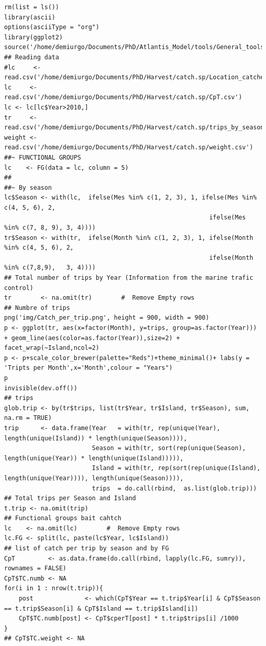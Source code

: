 \documentclass[11pt]{article}
\begin{document}
\begin{verbatim}
rm(list = ls())
library(ascii)
options(asciiType = "org")
library(ggplot2)
source('/home/demiurgo/Documents/PhD/Atlantis_Model/tools/General_tools/Atlantis_tools.R')
## Reading data
#lc     <- read.csv('/home/demiurgo/Documents/PhD/Harvest/catch.sp/Location_catches_fgs.csv')
lc     <- read.csv('/home/demiurgo/Documents/PhD/Harvest/catch.sp/CpT.csv')
lc <- lc[lc$Year>2010,]
tr     <- read.csv('/home/demiurgo/Documents/PhD/Harvest/catch.sp/trips_by_season.csv')
weight <- read.csv('/home/demiurgo/Documents/PhD/Harvest/catch.sp/weight.csv')
##~ FUNCTIONAL GROUPS
lc    <- FG(data = lc, column = 5)
##
##~ By season
lc$Season <- with(lc,  ifelse(Mes %in% c(1, 2, 3), 1, ifelse(Mes %in% c(4, 5, 6), 2,
                                                        ifelse(Mes %in% c(7, 8, 9), 3, 4))))
tr$Season <- with(tr,  ifelse(Month %in% c(1, 2, 3), 1, ifelse(Month %in% c(4, 5, 6), 2,
                                                        ifelse(Month %in% c(7,8,9),   3, 4))))
## Total number of trips by Year (Information from the marine trafic control)
tr        <- na.omit(tr)        #  Remove Empty rows
## Numbre of trips
png('img/Catch_per_trip.png', height = 900, width = 900)
p <- ggplot(tr, aes(x=factor(Month), y=trips, group=as.factor(Year))) + geom_line(aes(color=as.factor(Year)),size=2) + facet_wrap(~Island,ncol=2)
p <- p+scale_color_brewer(palette="Reds")+theme_minimal()+ labs(y = 'Tripts per Month',x='Month',colour = "Years")
p
invisible(dev.off())
## trips
glob.trip <- by(tr$trips, list(tr$Year, tr$Island, tr$Season), sum, na.rm = TRUE)
trip      <- data.frame(Year   = with(tr, rep(unique(Year), length(unique(Island)) * length(unique(Season)))),
                        Season = with(tr, sort(rep(unique(Season), length(unique(Year)) * length(unique(Island))))),
                        Island = with(tr, rep(sort(rep(unique(Island), length(unique(Year)))), length(unique(Season)))),
                        trips  = do.call(rbind,  as.list(glob.trip)))
## Total trips per Season and Island
t.trip <- na.omit(trip)
## Functional groups bait cahtch
lc    <- na.omit(lc)        #  Remove Empty rows
lc.FG <- split(lc, paste(lc$Year, lc$Island))
## list of catch per trip by season and by FG
CpT         <- as.data.frame(do.call(rbind, lapply(lc.FG, sumry)), rownames = FALSE)
CpT$TC.numb <- NA
for(i in 1 : nrow(t.trip)){
    post              <- which(CpT$Year == t.trip$Year[i] & CpT$Season == t.trip$Season[i] & CpT$Island == t.trip$Island[i])
    CpT$TC.numb[post] <- CpT$cperT[post] * t.trip$trips[i] /1000
}
## CpT$TC.weight <- NA

\end{verbatim}
\end{document}
